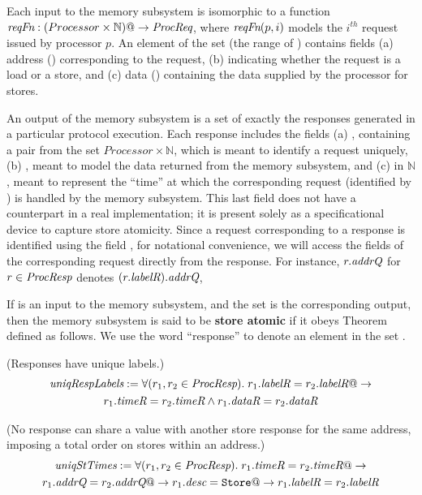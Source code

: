 Each input to the memory subsystem is isomorphic to a function
$\textit{reqFn} : (Processor \times \mathbb{N}) @-> \textit{ProcReq}$, where $\textit{reqFn}(p, i)$ models the
$i^{th}$ request issued by processor $p$. An element of the set \Request{} (the
range of \reqFn{}) contains fields (a) address (\addrQ) corresponding to
the request, (b) \desc{} indicating whether the request is a load or a store,
and (c) data (\dataQ) containing the data supplied by the processor for stores.

An output of the memory subsystem is a set \Response{} of exactly the responses generated
in a particular protocol execution.  Each response includes the fields
(a) , containing a pair from the set
$Processor \times \mathbb{N}$, which is meant to identify a request uniquely, (b)
\dataR, meant to model the data returned from the memory subsystem, and (c)
\timeR{} in $\mathbb{N}$, meant to represent the ``time'' at which
the corresponding request (identified by ) is handled by the memory
subsystem. This last field does not have a counterpart in a real implementation; it is
present solely as a specificational device to capture store atomicity. Since a
request corresponding to a response is identified using the field , for
notational convenience, we will access the fields of the corresponding request
directly from the response. For instance, $r.\textit{addrQ}$ for $r \in \textit{ProcResp}$
denotes $(r.\textit{labelR}).\textit{addrQ}$, \etc

If \reqFn{} is an input to the memory subsystem, and the set \Response{} is the
corresponding output, then the memory subsystem is said to be \textbf{store atomic} if it
obeys Theorem  defined as follows. We use the word
``response'' to denote an element in the set \Response{}.
%
\begin{defn} (Responses have unique labels.)
\small
\begin{multline*}
\textit{uniqRespLabels} := \forall (r_1, r_2 \in \textit{ProcResp}). \;
r_1.\textit{labelR} = r_2.\textit{labelR} @-> \\ r_1.\textit{timeR} = r_2.\textit{timeR} \wedge
r_1.\textit{dataR} = r_2.\textit{dataR}
\end{multline*}
\label{uniqRespLabels}
\end{defn}

\vspace{-.3in}

\begin{defn} (No response can share a \timeR{} value with another store
response for the same address, imposing a total order on stores within an address.)
\small
\begin{multline*}
\textit{uniqStTimes} := 
\forall (r_1, r_2 \in \textit{ProcResp}). \;
r_1.\textit{timeR} = r_2.\textit{timeR} @-> \\
r_1.\textit{addrQ} = r_2.\textit{addrQ} @->
r_1.\textit{desc} = \texttt{Store} @->
r_1.\textit{labelR} = r_2.\textit{labelR}
\end{multline*}
\label{uniqStTimes}
\end{defn}


